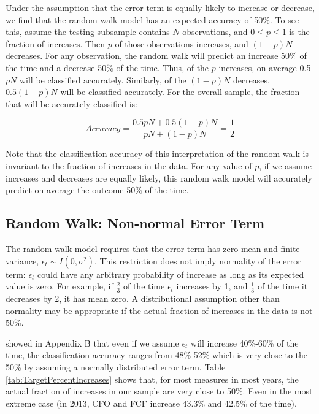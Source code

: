 Under the assumption that the error term is equally likely to increase or decrease, we find that the random walk model has an expected accuracy of 50\%. To see this, assume the testing subsample contains \(N\) observations, and  \(0 \leq p \leq 1\) is the fraction of increases. Then \(p\) of those observations increases, and \((1-p)N\) decreases. For any observation, the random walk will predict an increase 50\% of the time and a decrease 50\% of the time. Thus, of the \(p\) increases, on average 0.5\(pN\) will be classified accurately.  Similarly, of the \((1-p)N\) decreases, \(0.5(1-p)N\) will be classified accurately.  For the overall sample, the fraction that will be accurately classified is:

\[Accuracy= \frac{0.5pN+0.5(1-p)N}{pN+(1-p)N}=\frac{1}{2}\]

\noindent Note that the classification accuracy of this interpretation of the random walk is invariant to the fraction of increases in the data. For any value of \(p\), if we assume increases and decreases are equally likely, this random walk model will accurately predict on average the outcome 50\% of the time.

\subsection{Random Walk: Non-normal Error Term}

The random walk model requires that the error term has zero mean and finite variance, \(\epsilon_t \sim I(0,\sigma^2)\). This restriction does not imply normality of the error term: \(\epsilon_t\) could have any arbitrary probability of increase as long as its expected value is zero.  For example,  if \(\frac{2}{3}\) of the time \(\epsilon_t\) increases by 1, and \(\frac{1}{3}\) of the time it decreases by 2,  it has mean zero.  A distributional assumption other than normality may be appropriate if the actual fraction of increases in the data is not 50\%.

\cite{ABIS} showed in Appendix B  that even if we assume \(\epsilon_t\) will increase 40\%-60\% of the time, the classification accuracy ranges from 48\%-52\% which is very close to the 50\% by assuming a normally distributed error term. Table \ref{tab:TargetPercentIncreases} shows that,  for most measures in most years, the actual fraction of increases in our sample are very close to 50\%. Even in the most extreme case (in 2013,  CFO and FCF increase 43.3\% and 42.5\% of the time).

